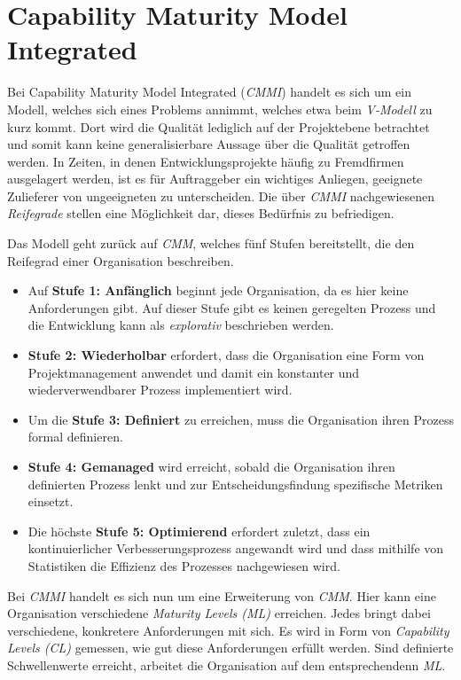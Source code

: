 \section{Capability Maturity Model Integrated}

Bei Capability Maturity Model Integrated (\textit{CMMI}) handelt es sich um ein Modell, welches sich eines Problems annimmt, welches etwa beim \textit{V-Modell} zu kurz kommt. Dort wird die Qualität lediglich auf der Projektebene betrachtet und somit kann keine generalisierbare Aussage über die Qualität getroffen werden. In Zeiten, in denen Entwicklungsprojekte häufig zu Fremdfirmen ausgelagert werden, ist es für Auftraggeber ein wichtiges Anliegen, geeignete Zulieferer von ungeeigneten zu unterscheiden. Die über \textit{CMMI} nachgewiesenen \textit{Reifegrade} stellen eine Möglichkeit dar, dieses Bedürfnis zu befriedigen.

Das Modell geht zurück auf \textit{CMM}, welches fünf Stufen bereitstellt, die den Reifegrad einer Organisation beschreiben.

\begin{itemize}
    \item Auf \textbf{Stufe 1: Anfänglich} beginnt jede Organisation, da es hier keine Anforderungen gibt. Auf dieser Stufe gibt es keinen geregelten Prozess und die Entwicklung kann als \textit{explorativ} beschrieben werden.
    \item \textbf{Stufe 2: Wiederholbar} erfordert, dass die Organisation eine Form von Projektmanagement anwendet und damit ein konstanter und wiederverwendbarer Prozess implementiert wird.
    \item Um die \textbf{Stufe 3: Definiert} zu erreichen, muss die Organisation ihren Prozess formal definieren.
    \item \textbf{Stufe 4: Gemanaged} wird erreicht, sobald die Organisation ihren definierten Prozess lenkt und zur Entscheidungsfindung spezifische Metriken einsetzt.
    \item Die höchste \textbf{Stufe 5: Optimierend} erfordert zuletzt, dass ein kontinuierlicher Verbesserungsprozess angewandt wird und dass mithilfe von Statistiken die Effizienz des Prozesses nachgewiesen wird.
\end{itemize}

Bei \textit{CMMI} handelt es sich nun um eine Erweiterung von \textit{CMM}. Hier kann eine Organisation verschiedene \textit{Maturity Levels (ML)} erreichen. Jedes bringt dabei verschiedene, konkretere Anforderungen mit sich. Es wird in Form von \textit{Capability Levels (CL)} gemessen, wie gut diese Anforderungen erfüllt werden. Sind definierte Schwellenwerte erreicht, arbeitet die Organisation auf dem entsprechendenn \textit{ML}.

